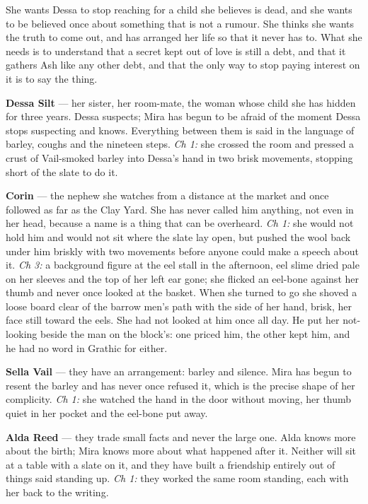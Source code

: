 \documentclass{design/chronicle}
\begin{document}
{
She wants Dessa to stop reaching for a child she believes is dead, and she wants to be believed once about something that is not a rumour. She thinks she wants the truth to come out, and has arranged her life so that it never has to. What she needs is to understand that a secret kept out of love is still a debt, and that it gathers Ash like any other debt, and that the only way to stop paying interest on it is to say the thing.

\textbf{Dessa Silt} — her sister, her room-mate, the woman whose child she has hidden for three years. Dessa suspects; Mira has begun to be afraid of the moment Dessa stops suspecting and knows. Everything between them is said in the language of barley, coughs and the nineteen steps. \emph{Ch 1:} she crossed the room and pressed a crust of Vail-smoked barley into Dessa’s hand in two brisk movements, stopping short of the slate to do it.

\textbf{Corin} — the nephew she watches from a distance at the market and once followed as far as the Clay Yard. She has never called him anything, not even in her head, because a name is a thing that can be overheard. \emph{Ch 1:} she would not hold him and would not sit where the slate lay open, but pushed the wool back under him briskly with two movements before anyone could make a speech about it. \emph{Ch 3:} a background figure at the eel stall in the afternoon, eel slime dried pale on her sleeves and the top of her left ear gone; she flicked an eel-bone against her thumb and never once looked at the basket. When she turned to go she shoved a loose board clear of the barrow men’s path with the side of her hand, brisk, her face still toward the eels. She had not looked at him once all day. He put her not-looking beside the man on the block’s: one priced him, the other kept him, and he had no word in Grathic for either.

\textbf{Sella Vail} — they have an arrangement: barley and silence. Mira has begun to resent the barley and has never once refused it, which is the precise shape of her complicity. \emph{Ch 1:} she watched the hand in the door without moving, her thumb quiet in her pocket and the eel-bone put away.

\textbf{Alda Reed} — they trade small facts and never the large one. Alda knows more about the birth; Mira knows more about what happened after it. Neither will sit at a table with a slate on it, and they have built a friendship entirely out of things said standing up. \emph{Ch 1:} they worked the same room standing, each with her back to the writing.

}
\end{document}
